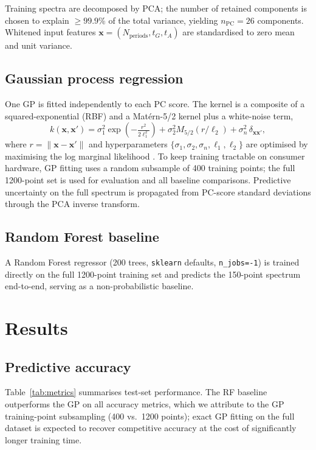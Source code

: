\documentclass[9pt,twocolumn]{optica-article}
\begin{document}
Training spectra are decomposed by PCA; the number of retained components is chosen
to explain $\geq99.9$\% of the total variance, yielding $n_\mathrm{PC}=26$
components.
Whitened input features $\mathbf{x}=(N_\mathrm{periods},t_G,t_A)$ are
standardised to zero mean and unit variance.

\subsection{Gaussian process regression}

One GP is fitted independently to each PC score.
The kernel is a composite of a squared-exponential (RBF) and a Mat\'{e}rn-5/2
kernel plus a white-noise term,
\begin{equation}
  k(\mathbf{x},\mathbf{x}') =
  \sigma_1^2 \exp\!\left(-\tfrac{r^2}{2\ell_1^2}\right)
  + \sigma_2^2 M_{5/2}(r/\ell_2)
  + \sigma_n^2\,\delta_{\mathbf{x}\mathbf{x}'},
\end{equation}
where $r=\|\mathbf{x}-\mathbf{x}'\|$ and hyperparameters
$\{\sigma_1,\sigma_2,\sigma_n,\ell_1,\ell_2\}$ are optimised by maximising
the log marginal likelihood \cite{Rasmussen2006}.
To keep training tractable on consumer hardware, GP fitting uses a random subsample
of 400 training points; the full 1200-point set is used for evaluation and all
baseline comparisons.
Predictive uncertainty on the full spectrum is propagated from PC-score standard
deviations through the PCA inverse transform.

\subsection{Random Forest baseline}

A Random Forest regressor (200 trees, \texttt{sklearn} defaults, \texttt{n\_jobs=-1})
is trained directly on the full 1200-point training set and predicts the 150-point
spectrum end-to-end, serving as a non-probabilistic baseline.


\section{Results}

\subsection{Predictive accuracy}

Table~\ref{tab:metrics} summarises test-set performance.
The RF baseline outperforms the GP on all accuracy metrics, which we attribute to
the GP training-point subsampling (400 vs.\ 1200 points); exact GP fitting on the
full dataset is expected to recover competitive accuracy at the cost of significantly
longer training time.
\end{document}
